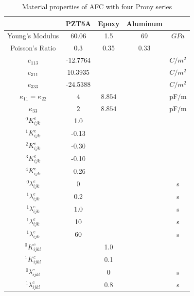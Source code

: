 \begin{table}
\caption{Material properties of AFC with four Prony series}
\centering
\begin{tabular}{ccccc} \hline
               & PZT5A & Epoxy & Aluminum & \\ \hline 
Young's Modulus&60.06 & 1.5     & 69       &$GPa$    \\ 
Poisson's Ratio&$0.3$ & 0.35    & 0.33 &\\  
$e_{113}$      &-12.7764 &         &      &$C/m^2$\\ 
$e_{311}$      &10.3935&         &      &$C/m^2$\\ 
$e_{333}$      &-24.5388  &         &      &$C/m^2$\\ 
$\kappa_{11}=\kappa_{22}$ &  $ 4  $ & $8.854  $ & &  pF/m \\ 
$\kappa_{33}$ & $2  $              & $8.854  $ & &  pF/m \\ 
${}^{0}K_{ijk}^{e}$&1.0& & &  \\ 
${}^{1}K_{ijk}^{e}$&-0.13& & & \\ 
${}^{2}K_{ijk}^{e}$&-0.30& & & \\ 
${}^{3}K_{ijk}^{e}$&-0.10& & & \\ 
${}^{4}K_{ijk}^{e}$&-0.26& & & \\ 
${}^{0}\lambda_{ijk}^{e}$&0& & & s \\ 
${}^{1}\lambda_{ijk}^{e}$&0.2& & & s \\  
${}^{1}\lambda_{ijk}^{e}$&1.0& & & s \\  
${}^{1}\lambda_{ijk}^{e}$&10& & & s \\  
${}^{1}\lambda_{ijk}^{e}$&60& & & s \\  
${}^{0}K_{ijkl}^{c}$& &1.0 & &  \\ 
${}^{1}K_{ijkl}^{c}$& &0.1 & & \\ 
${}^{0}\lambda_{ijkl}^{c}$& &0&  & s\\ 
${}^{1}\lambda_{ijkl}^{c}$& &0.8 & & s \\ \hline 
\end{tabular}
\label{table:afc_freq_xp_model:fig}
\end{table} 